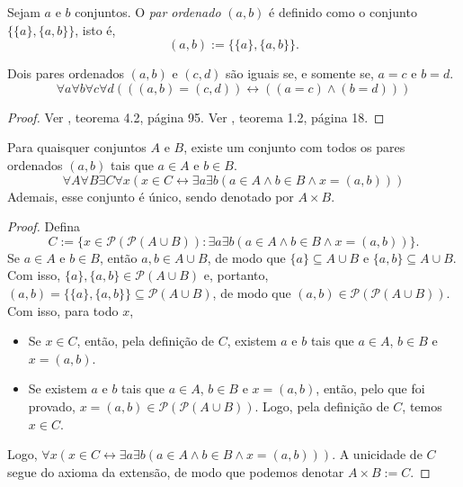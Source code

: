 \begin{definition}
    Sejam $a$ e $b$ conjuntos. O \emph{par ordenado} $(a,b)$ é definido como o conjunto $\{ \{ a \}, \{a,b \} \}$, isto é,
        \[
            (a,b) := \{ \{ a \}, \{a,b \} \}.
        \]
\end{definition}

\begin{proposition}
    Dois pares ordenados $(a,b)$ e $(c,d)$ são iguais se, e somente se, $a = c$ e $b=d$.
        \[
            \forall a \forall b \forall c \forall d ( ((a,b) = (c,d)) \leftrightarrow ((a=c) \land (b=d)))
        \]
\end{proposition}

\begin{proof}
    Ver \cite{fajardo2024conjuntos}, teorema 4.2, página 95. Ver \cite{jechhrbacek1999}, teorema 1.2, página 18. \blackproof
\end{proof}

\begin{theorem} \label{teo.set:prodcart}
    Para quaisquer conjuntos $A$ e $B$, existe um conjunto com todos os pares ordenados $(a,b)$ tais que $a \in A$ e $b \in B$.
        \[
            \forall A \forall B \exists C \forall x (x \in C \leftrightarrow \exists a \exists b (a \in A \land b \in B \land x = (a,b))) 
        \]
    Ademais, esse conjunto é único, sendo denotado por $A \times B$.
\end{theorem}

\begin{proof}
    Defina
        \[
            C := \{x \in \mathcal{P}{(\mathcal{P}{(A \cup B)})} : \exists a \exists b (a \in A \land b \in B \land x = (a,b)) \}.
        \]
    Se $a \in A$ e $b \in B$, então $a,b \in A \cup B$, de modo que $\{a\} \subseteq A \cup B$ e $\{a,b\} \subseteq A \cup B$. Com isso, $\{a\},\{a,b\} \in \mathcal{P}{(A \cup B)}$ e, portanto, $(a,b)=\{\{a\},\{a,b\}\} \subseteq \mathcal{P}{(A \cup B)}$,
    de modo que $(a,b) \in \mathcal{P}{(\mathcal{P}{(A \cup B)})}$. Com isso, para todo $x$,
        \begin{itemize}[align=left]
            \item[($\Rightarrow$)] Se $x \in C$, então, pela definição de $C$, existem $a$ e $b$ tais que $a \in A$, $b \in B$ e $x=(a,b)$.
            \item[($\Leftarrow$)] Se existem $a$ e $b$ tais que $a \in A$, $b \in B$ e $x=(a,b)$, então, pelo que foi provado, $x=(a,b) \in \mathcal{P}{(\mathcal{P}{(A \cup B)})}$. Logo, pela definição de $C$, temos $x \in C$.
        \end{itemize}
    Logo, $\forall x(x \in C \leftrightarrow \exists a \exists b(a \in A \land b \in B \land x=(a,b)))$. A unicidade de $C$ segue do axioma da extensão, de modo que podemos denotar $A \times B := C$. \blackproof
\end{proof}

